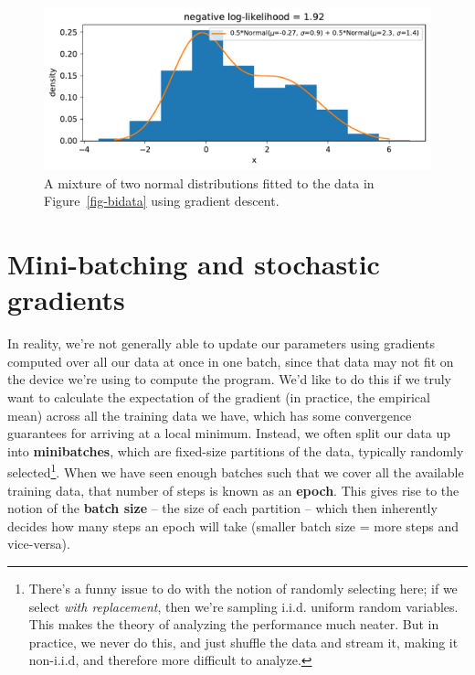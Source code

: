 \documentclass[
  11pt,
  numbers=noendperiod]{book}
\begin{document}
\begin{figure}

{\centering \includegraphics{./diffprog_files/figure-pdf/fig-twonorm-output-1.pdf}

}

\caption{\label{fig-twonorm}A mixture of two normal distributions fitted
to the data in Figure~\ref{fig-bidata} using gradient descent.}

\end{figure}

\hypertarget{mini-batching-and-stochastic-gradients}{%
\section{Mini-batching and stochastic
gradients}\label{mini-batching-and-stochastic-gradients}}

In reality, we're not generally able to update our parameters using
gradients computed over all our data at once in one batch, since that
data may not fit on the device we're using to compute the program. We'd
like to do this if we truly want to calculate the expectation of the
gradient (in practice, the empirical mean) across all the training data
we have, which has some convergence guarantees for arriving at a local
minimum. Instead, we often split our data up into \textbf{minibatches},
which are fixed-size partitions of the data, typically randomly
selected\footnote{There's a funny issue to do with the notion of
  randomly selecting here; if we select \emph{with replacement}, then
  we're sampling i.i.d. uniform random variables. This makes the theory
  of analyzing the performance much neater. But in practice, we never do
  this, and just shuffle the data and stream it, making it non-i.i.d,
  and therefore more difficult to analyze.}. When we have seen enough
batches such that we cover all the available training data, that number
of steps is known as an \textbf{epoch}. This gives rise to the notion of
the \textbf{batch size} -- the size of each partition -- which then
inherently decides how many steps an epoch will take (smaller batch size
= more steps and vice-versa).
\end{document}
